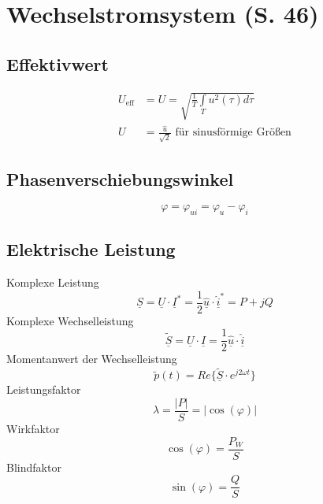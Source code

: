 \documentclass[a4paper,twocolumn,10pt]{article}
\begin{document}
\section{Wechselstromsystem (S. 46)}

\subsection{Effektivwert}
\begin{equation*}
\begin{split}
U_{\text{eff}}&=U=\sqrt{\frac{1}{T}\int\limits_Tu^2(\tau)d\tau}\\
U&=\frac{\hat{u}}{\sqrt{2}}\text{ für sinusförmige Größen}
\end{split}
\end{equation*}

\subsection{Phasenverschiebungswinkel}
\begin{equation*}
\varphi=\varphi_{ui}=\varphi_u-\varphi_i
\end{equation*}

\subsection{Elektrische Leistung}
Komplexe Leistung
\begin{equation*}
\underline{S}=\underline{U}\cdot\underline{I}^*=\frac{1}{2}\underline{\hat{u}}\cdot\underline{\hat{i}}^*=P+jQ
\end{equation*}
Komplexe Wechselleistung
\begin{equation*}
\underline{\tilde{S}}=\underline{U}\cdot\underline{I}=\frac{1}{2}\underline{\hat{u}}\cdot\underline{\hat{i}}
\end{equation*}
Momentanwert der Wechselleistung
\begin{equation*}
\tilde{p}(t)=Re\{\tilde{\underline{S}}\cdot e^{j2\omega t}\}
\end{equation*}
Leistungsfaktor
\begin{equation*}
\lambda=\frac{|P|}{S}=|\cos(\varphi)|
\end{equation*}
Wirkfaktor
\begin{equation*}
\cos(\varphi)=\frac{P_W}{S}
\end{equation*}
Blindfaktor
\begin{equation*}
\sin(\varphi)=\frac{Q}{S}
\end{equation*}
\end{document}
